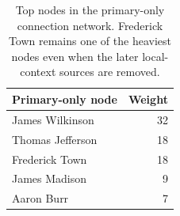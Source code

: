 \begin{table}[t]
\centering
\small
\begin{tabular}{lr}
\toprule
Primary-only node & Weight \\
\midrule
James Wilkinson & 32 \\
Thomas Jefferson & 18 \\
Frederick Town & 18 \\
James Madison & 9 \\
Aaron Burr & 7 \\
\bottomrule
\end{tabular}
\caption{Top nodes in the primary-only connection network. Frederick Town remains one of the heaviest nodes even when the later local-context sources are removed.}
\label{tab:primarynetwork}
\end{table}
